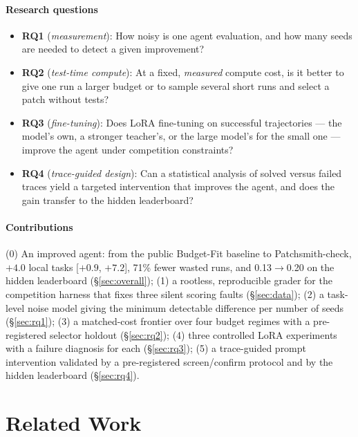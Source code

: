 \documentclass[conference]{IEEEtran}
\newcommand{\RQ}[1]{\textbf{RQ#1}}
\begin{document}
\paragraph*{Research questions}
\begin{itemize}
\item \RQ{1} (\emph{measurement}): How noisy is one agent evaluation, and how many seeds are needed to detect a given improvement?
\item \RQ{2} (\emph{test-time compute}): At a fixed, \emph{measured} compute cost, is it better to give one run a larger budget or to sample several short runs and select a patch without tests?
\item \RQ{3} (\emph{fine-tuning}): Does LoRA fine-tuning on successful trajectories --- the model's own, a stronger teacher's, or the large model's for the small one --- improve the agent under competition constraints?
\item \RQ{4} (\emph{trace-guided design}): Can a statistical analysis of solved versus failed traces yield a targeted intervention that improves the agent, and does the gain transfer to the hidden leaderboard?
\end{itemize}

\paragraph*{Contributions}
(0) An improved agent: from the public Budget-Fit baseline to Patchsmith-check, $+4.0$ local tasks [$+0.9$, $+7.2$], 71\% fewer wasted runs, and 0.13$\rightarrow$0.20 on the hidden leaderboard (§\ref{sec:overall}); (1) a rootless, reproducible grader for the competition harness that fixes three silent scoring faults (§\ref{sec:data}); (2) a task-level noise model giving the minimum detectable difference per number of seeds (§\ref{sec:rq1}); (3) a matched-cost frontier over four budget regimes with a pre-registered selector holdout (§\ref{sec:rq2}); (4) three controlled LoRA experiments with a failure diagnosis for each (§\ref{sec:rq3}); (5) a trace-guided prompt intervention validated by a pre-registered screen/confirm protocol and by the hidden leaderboard (§\ref{sec:rq4}).

\section{Related Work}
\end{document}
